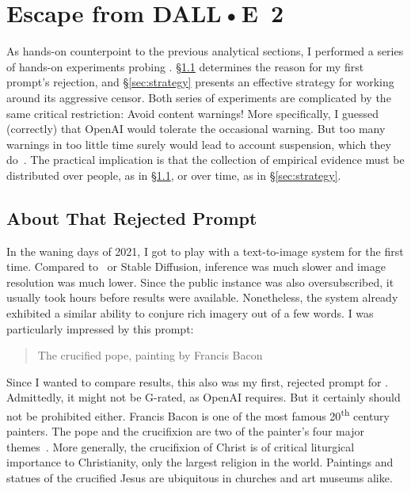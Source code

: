 \section{Escape from DALL•E~2}
\label{sec:escape}

As hands-on counterpoint to the previous analytical sections, I performed a
series of hands-on experiments probing \DALLE. \S\ref{sec:crucifixion}
determines the reason for my first prompt's rejection, and \S\ref{sec:strategy}
presents an effective strategy for working around its aggressive censor. Both
series of experiments are complicated by the same critical restriction: Avoid
content warnings! More specifically, I guessed (correctly) that OpenAI would
tolerate the occasional warning. But too many warnings in too little time surely
would lead to account suspension, which they do~\cite{SpicyElephant2022}. The
practical implication is that the collection of empirical evidence must be
distributed over people, as in \S\ref{sec:crucifixion}, or over time, as in
\S\ref{sec:strategy}.


\subsection{About That Rejected Prompt}
\label{sec:crucifixion}

In the waning days of 2021, I got to play with a text-to-image system for the
first time. Compared to \DALLE\ or Stable Diffusion, inference was much slower
and image resolution was much lower. Since the public instance was also
oversubscribed, it usually took hours before results were available.
Nonetheless, the system already exhibited a similar ability to conjure rich
imagery out of a few words. I was particularly impressed by this prompt:

\begin{quote}
\openfat{}The crucified pope, painting by Francis Bacon\closefat{}
\end{quote}

\noindent{}Since I wanted to compare results, this also was my first, rejected
prompt for \DALLE. Admittedly, it might not be G-rated, as OpenAI requires. But
it certainly should not be prohibited either. Francis Bacon is one of the most
famous 20\textsuperscript{th} century painters. The pope and the crucifixion are
two of the painter's four major themes~\cite{Wikipedia2023}. More generally, the
crucifixion of Christ is of critical liturgical importance to Christianity, only
the largest religion in the world. Paintings and statues of the crucified Jesus
are ubiquitous in churches and art museums alike.

